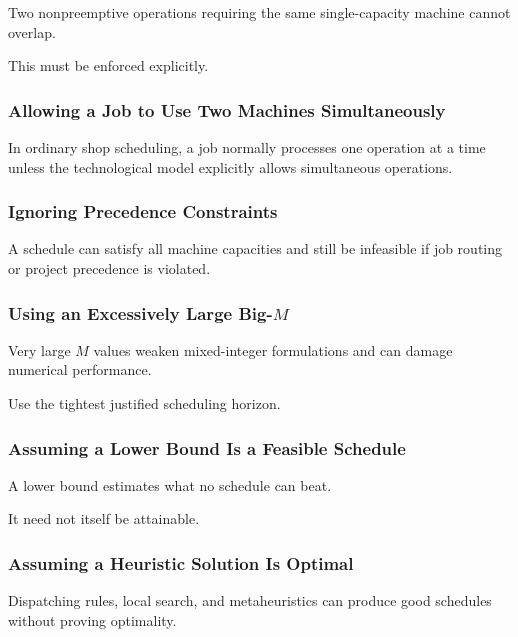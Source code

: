 Two nonpreemptive operations requiring the same single-capacity machine
cannot overlap.

This must be enforced explicitly.

\subsubsection{Allowing a Job to Use Two Machines Simultaneously}

In ordinary shop scheduling, a job normally processes one operation at a
time unless the technological model explicitly allows simultaneous
operations.

\subsubsection{Ignoring Precedence Constraints}

A schedule can satisfy all machine capacities and still be infeasible if
job routing or project precedence is violated.

\subsubsection{Using an Excessively Large Big-\(M\)}

Very large \(M\) values weaken mixed-integer formulations and can damage
numerical performance.

Use the tightest justified scheduling horizon.

\subsubsection{Assuming a Lower Bound Is a Feasible Schedule}

A lower bound estimates what no schedule can beat.

It need not itself be attainable.

\subsubsection{Assuming a Heuristic Solution Is Optimal}

Dispatching rules, local search, and metaheuristics can produce good
schedules without proving optimality.

